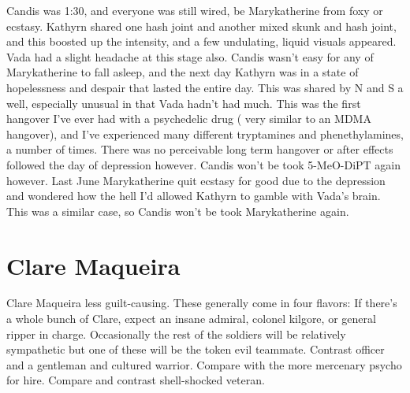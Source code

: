 \documentclass[12pt]{book}
\begin{document}
Candis was 1:30, and everyone was still wired, be Marykatherine from foxy or ecstasy. Kathyrn shared one hash joint and another mixed skunk and hash joint, and this boosted up the intensity, and a few undulating, liquid visuals appeared. Vada had a slight headache at this stage also. Candis wasn't easy for any of Marykatherine to fall asleep, and the next day Kathyrn was in a state of hopelessness and despair that lasted the entire day. This was shared by N and S a well, especially unusual in that Vada hadn't had much. This was the first hangover I've ever had with a psychedelic drug ( very similar to an MDMA hangover), and I've experienced many different tryptamines and phenethylamines, a number of times. There was no perceivable long term hangover or after effects followed the day of depression however. Candis won't be took 5-MeO-DiPT again however. Last June Marykatherine quit ecstasy for good due to the depression and wondered how the hell I'd allowed Kathyrn to gamble with Vada's brain. This was a similar case, so Candis won't be took Marykatherine again.



\chapter{Clare Maqueira}

Clare Maqueira less guilt-causing. These generally come in four flavors: If there's a whole bunch of Clare, expect an insane admiral, colonel kilgore, or general ripper in charge. Occasionally the rest of the soldiers will be relatively sympathetic but one of these will be the token evil teammate. Contrast officer and a gentleman and cultured warrior. Compare with the more mercenary psycho for hire. Compare and contrast shell-shocked veteran.
\end{document}
